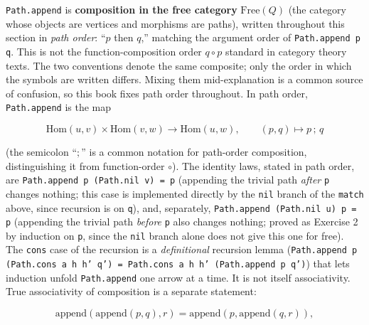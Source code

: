 \begin{mathreading}

\texttt{Path.append} is \textbf{composition in the free category} \(\mathrm{Free}(Q)\) (the category whose objects are vertices and morphisms are paths), written throughout this section in \emph{path order}: ``\(p\) then \(q\),'' matching the argument order of \texttt{Path.append p q}. This is not the function-composition order \(q \circ p\) standard in category theory texts. The two conventions denote the same composite; only the order in which the symbols are written differs. Mixing them mid-explanation is a common source of confusion, so this book fixes path order throughout. In path order, \texttt{Path.append} is the map

\end{mathreading}

\[
\mathrm{Hom}(u,v) \times \mathrm{Hom}(v,w) \longrightarrow \mathrm{Hom}(u,w),
\qquad (p, q) \longmapsto p\,;\,q
\]

(the semicolon ``\(;\)'' is a common notation for path-order composition, distinguishing it from function-order \(\circ\)). The identity laws, stated in path order, are \texttt{Path.append p (Path.nil v) = p} (appending the trivial path \emph{after} \texttt{p} changes nothing; this case is implemented directly by the \texttt{nil} branch of the \texttt{match} above, since recursion is on \texttt{q}), and, separately, \texttt{Path.append (Path.nil u) p = p} (appending the trivial path \emph{before} \texttt{p} also changes nothing; proved as Exercise 2 by induction on \texttt{p}, since the \texttt{nil} branch alone does not give this one for free). The \texttt{cons} case of the recursion is a \emph{definitional} recursion lemma (\texttt{Path.append p (Path.cons a h h' q') = Path.cons a h h' (Path.append p q')}) that lets induction unfold \texttt{Path.append} one arrow at a time. It is not itself associativity. True associativity of composition is a separate statement:

\[
\mathrm{append}(\mathrm{append}(p, q), r) = \mathrm{append}(p, \mathrm{append}(q, r)),
\]

